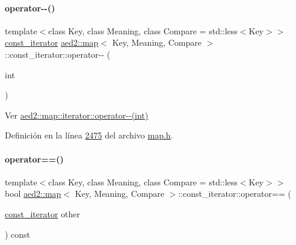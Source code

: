 \paragraph{\texorpdfstring{operator-\/-\/()}{operator--()}\hspace{0.1cm}{\footnotesize\ttfamily [2/2]}}
{\footnotesize\ttfamily template$<$class Key, class Meaning, class Compare = std\+::less$<$\+Key$>$$>$ \\
\hyperlink{classaed2_1_1map_1_1const__iterator}{const\+\_\+iterator} \hyperlink{classaed2_1_1map}{aed2\+::map}$<$ Key, Meaning, Compare $>$\+::const\+\_\+iterator\+::operator-\/-\/ (\begin{DoxyParamCaption}\item[{int}]{ }\end{DoxyParamCaption})\hspace{0.3cm}{\ttfamily [inline]}}



Ver \hyperlink{classaed2_1_1map_1_1iterator_add45e9ddbb8eeda99326cdb9ac9dd225_add45e9ddbb8eeda99326cdb9ac9dd225}{aed2\+::map\+::iterator\+::operator-\/-\/(int)} 



Definición en la línea \hyperlink{map_8h_source_l02475}{2475} del archivo \hyperlink{map_8h_source}{map.\+h}.

\mbox{\label{classaed2_1_1map_1_1const__iterator_a2ad68c35012e0c6b67d67c04d96585be_a2ad68c35012e0c6b67d67c04d96585be}} 
\paragraph{\texorpdfstring{operator==()}{operator==()}}
{\footnotesize\ttfamily template$<$class Key, class Meaning, class Compare = std\+::less$<$\+Key$>$$>$ \\
bool \hyperlink{classaed2_1_1map}{aed2\+::map}$<$ Key, Meaning, Compare $>$\+::const\+\_\+iterator\+::operator== (\begin{DoxyParamCaption}\item[{\hyperlink{classaed2_1_1map_1_1const__iterator}{const\+\_\+iterator}}]{other }\end{DoxyParamCaption}) const\hspace{0.3cm}{\ttfamily [inline]}}



